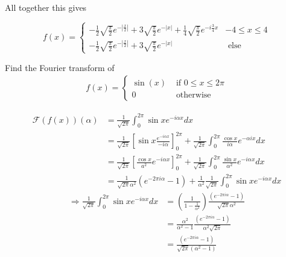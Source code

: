\documentclass[11pt]{article}
\begin{document}
\begin{solution}
All together this gives

$$
f(x) = \begin{cases}-\frac{1}{2} \sqrt{\frac{\pi}{2}} e^{-\left|\frac{x}{2}\right|}+3 \sqrt{\frac{\pi}{2}} e^{-|x|}+\frac{1}{4} \sqrt{\frac{\pi}{2}} e^{-i \frac{3}{4} x} & -4 \leq x \leq 4 \\ -\frac{1}{2} \sqrt{\frac{\pi}{2}} e^{-\left|\frac{x}{2}\right|}+3 \sqrt{\frac{\pi}{2}} e^{-|x|} & \text { else }\end{cases}
$$
\end{solution}

\begin{exercise}
    Find the Fourier transform of 
    \begin{align*}
        f(x) = \left\{\begin{array}{ll}
                \sin(x) & \text{ if } 0 \leq x \leq 2 \pi 
                \\
                0 & \text{ otherwise }
               \end{array}
               \right.
    \end{align*}
\end{exercise}
\begin{solution} 
$$\begin{aligned} \mathcal{F}(f(x))(\alpha) & =\frac{1}{\sqrt{2 \pi}} \int_0^{2 \pi} \sin x e^{-i \alpha x} d x \\ & =\frac{1}{\sqrt{2 \pi}}\left[\sin x \frac{e^{-i \alpha x}}{-i \alpha}\right]_0^{2 \pi}+\frac{1}{\sqrt{2 \pi}} \int_0^{2 \pi} \frac{\cos x}{i \alpha} e^{-\alpha i x} d x \\ & =\frac{1}{\sqrt{2 \pi}}\left[\frac{\cos x}{a^2} e^{-i \alpha x}\right]_0^{2 \pi}+\frac{1}{\sqrt{2 \pi}} \int_0^{2 \pi} \frac{\sin x}{\alpha^2} e^{-i \alpha x} d x \\ & =\frac{1}{\sqrt{2 \pi} \alpha^2}\left(e^{-2 \pi i \alpha}-1\right)+\frac{1}{\alpha^2} \frac{1}{\sqrt{2 \pi}} \int_0^{2 \pi} \sin x e^{-i \alpha x} d x\end{aligned}$$
$$
\begin{aligned} \Rightarrow \frac{1}{\sqrt{2 \pi}} \int_0^{2 \pi} \sin x e^{-i \alpha x} d x & =\left(\frac{1}{1-\frac{1}{\alpha^2}}\right) \frac{\left(e^{-2 \pi i \alpha}-1\right)}{\sqrt{2 \pi} \alpha^2} \\ & =\frac{\alpha^2}{\alpha^2-1} \frac{\left(e^{-2 \pi i \alpha}-1\right)}{\alpha^2 \sqrt{2 \pi}} \\ & =\frac{\left(e^{-2 \pi i \alpha}-1\right)}{\sqrt{2 \pi}\left(\alpha^2-1\right)}\end{aligned}
$$
\end{solution}
\end{document}
